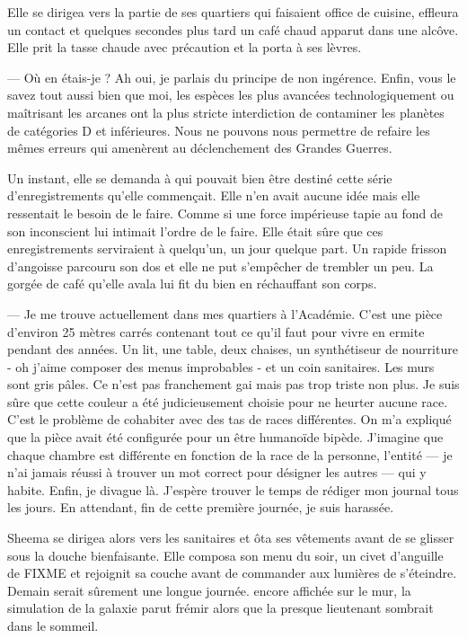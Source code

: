 Elle se dirigea vers la partie de ses quartiers qui faisaient office de cuisine,
effleura un contact et quelques secondes plus tard un café chaud apparut dans
une alcôve. Elle prit la tasse chaude avec précaution et la porta à ses lèvres.

— Où en étais-je ? Ah oui, je parlais du principe de non ingérence. Enfin, vous
le savez tout aussi bien que moi, les espèces les plus avancées
technologiquement ou maîtrisant les arcanes ont la plus stricte interdiction de
contaminer les planètes de catégories D et inférieures. Nous ne pouvons nous
permettre de refaire les mêmes erreurs qui amenèrent au déclenchement des
Grandes Guerres.

Un instant, elle se demanda à qui pouvait bien être destiné cette série
d'enregistrements qu'elle commençait. Elle n'en avait aucune idée mais elle
ressentait le besoin de le faire. Comme si une force impérieuse tapie au fond de
son inconscient lui intimait l'ordre de le faire. Elle était sûre que ces
enregistrements serviraient à quelqu'un, un jour quelque part. Un rapide frisson
d'angoisse parcouru son dos et elle ne put s'empêcher de trembler un peu. La
gorgée de café qu'elle avala lui fit du bien en réchauffant son corps.

— Je me trouve actuellement dans mes quartiers à l'Académie. C'est une pièce
d'environ 25 mètres carrés contenant tout ce qu'il faut pour vivre en ermite
pendant des années. Un lit, une table, deux chaises, un synthétiseur de
nourriture - oh j'aime composer des menus improbables - et un coin sanitaires.
Les murs sont gris pâles. Ce n'est pas franchement gai mais pas trop triste non
plus. Je suis sûre que cette couleur a été judicieusement choisie pour ne
heurter aucune race. C'est le problème de cohabiter avec des tas de races
différentes. On m'a expliqué que la pièce avait été configurée pour un être
humanoïde bipède. J'imagine que chaque chambre est différente en fonction de la
race de la personne, l'entité — je n'ai jamais réussi à trouver un mot correct
pour désigner les autres — qui y habite. Enfin, je divague là. J'espère trouver
le temps de rédiger mon journal tous les jours. En attendant, fin de cette
première journée, je suis harassée.

Sheema se dirigea alors vers les sanitaires et ôta ses vêtements avant de se
glisser sous la douche bienfaisante. Elle composa son menu du soir, un civet
d'anguille de FIXME et rejoignit sa couche avant de commander aux lumières de
s'éteindre. Demain serait sûrement une longue journée. encore affichée sur le
mur, la simulation de la galaxie parut frémir alors que la presque lieutenant
sombrait dans le sommeil.


